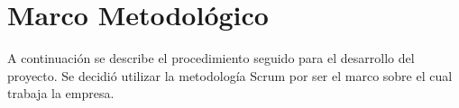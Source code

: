\chapter{Marco Metodológico} \label{chap:Marco Metodologico}

A continuación se describe el procedimiento seguido para el desarrollo del proyecto. Se decidió utilizar la metodología Scrum por ser el marco sobre el cual trabaja la empresa.
